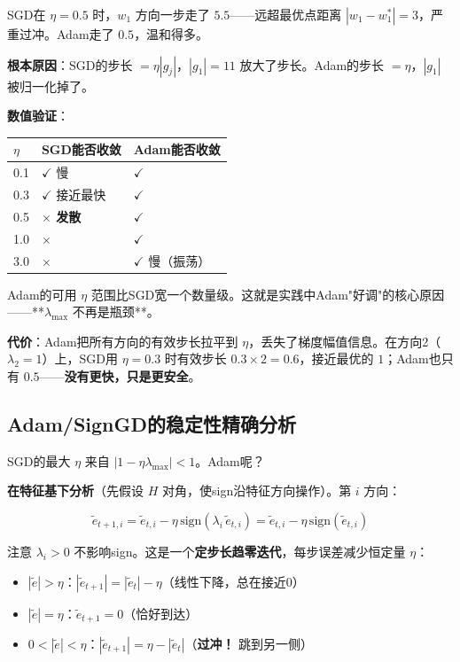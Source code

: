 \documentclass[12pt,a4paper]{article}
\begin{document}
SGD在 $\eta = 0.5$ 时，$w_1$ 方向一步走了 $5.5$——远超最优点距离 $|w_1 - w_1^*| = 3$，严重过冲。Adam走了 $0.5$，温和得多。

\textbf{根本原因}：SGD的步长 $= \eta |g_j|$，$|g_1| = 11$ 放大了步长。Adam的步长 $= \eta$，$|g_1|$ 被归一化掉了。

\textbf{数值验证}：








\begin{center}\small
\begin{longtable}{|l|l|l|}
\hline
$\eta$ & SGD能否收敛 & Adam能否收敛 \\
\hline
0.1 & $\checkmark$ 慢 & $\checkmark$ \\
0.3 & $\checkmark$ 接近最快 & $\checkmark$ \\
0.5 & \textbf{$\times$ 发散} & $\checkmark$ \\
1.0 & $\times$ & $\checkmark$ \\
3.0 & $\times$ & $\checkmark$ 慢（振荡） \\
\hline
\end{longtable}
\end{center}


Adam的可用 $\eta$ 范围比SGD宽一个数量级。这就是实践中Adam"好调"的核心原因——**$\lambda_{\max}$ 不再是瓶颈**。

\textbf{代价}：Adam把所有方向的有效步长拉平到 $\eta$，丢失了梯度幅值信息。在方向2（$\lambda_2 = 1$）上，SGD用 $\eta = 0.3$ 时有效步长 $0.3 \times 2 = 0.6$，接近最优的 $1$；Adam也只有 $0.5$——\textbf{没有更快，只是更安全}。


\subsection{Adam/SignGD的稳定性精确分析}

SGD的最大 $\eta$ 来自 $|1 - \eta\lambda_{\max}| < 1$。Adam呢？

\textbf{在特征基下分析}（先假设 $H$ 对角，使sign沿特征方向操作）。第 $i$ 方向：


\[\tilde{e}_{t+1,i} = \tilde{e}_{t,i} - \eta\,\text{sign}(\lambda_i\,\tilde{e}_{t,i}) = \tilde{e}_{t,i} - \eta\,\text{sign}(\tilde{e}_{t,i})\]

注意 $\lambda_i > 0$ 不影响sign。这是一个\textbf{定步长趋零迭代}，每步误差减少恒定量 $\eta$：

\begin{itemize}[leftmargin=*,nosep]
\item $|\tilde{e}| > \eta$：$|\tilde{e}_{t+1}| = |\tilde{e}_t| - \eta$（线性下降，总在接近0）
\item $|\tilde{e}| = \eta$：$\tilde{e}_{t+1} = 0$（恰好到达）
\item $0 < |\tilde{e}| < \eta$：$|\tilde{e}_{t+1}| = \eta - |\tilde{e}_t|$（\textbf{过冲！} 跳到另一侧）
\end{itemize}
\end{document}
